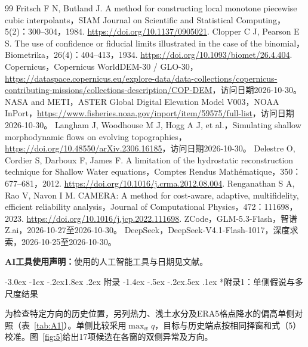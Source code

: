 \documentclass[withoutpreface]{cumcmthesis}
\makeatletter
\providecommand{\heiti}{\CJKfamily{zhhei}}
\renewcommand\section{\@startsection{section}{1}{\z@}%
 {-3.0ex \@plus -1ex \@minus -.2ex}{1.8ex \@plus .2ex}%
 {\centering\normalfont\heiti\fontsize{14}{18}\selectfont\bfseries}}
\renewcommand\subsection{\@startsection{subsection}{2}{\z@}%
 {-1.4ex \@plus -.5ex \@minus -.2ex}{.5ex \@plus .1ex}%
 {\normalfont\heiti\fontsize{14}{18}\selectfont\bfseries}}
\makeatother
\begin{document}
\begin{thebibliography}{99}
 Fritsch F N, Butland J. A method for constructing local monotone piecewise cubic interpolants，SIAM Journal on Scientific and Statistical Computing，5(2)：300–304，1984. \url{https://doi.org/10.1137/0905021}.
 Clopper C J, Pearson E S. The use of confidence or fiducial limits illustrated in the case of the binomial，Biometrika，26(4)：404–413，1934. \url{https://doi.org/10.1093/biomet/26.4.404}.
 Copernicus，Copernicus WorldDEM-30 / GLO-30，\url{https://dataspace.copernicus.eu/explore-data/data-collections/copernicus-contributing-missions/collections-description/COP-DEM}，访问日期2026-10-30。
 NASA and METI，ASTER Global Digital Elevation Model V003，NOAA InPort，\url{https://www.fisheries.noaa.gov/inport/item/59575/full-list}，访问日期2026-10-30。
 Langham J, Woodhouse M J, Hogg A J, et al.，Simulating shallow morphodynamic flows on evolving topographies，\url{https://doi.org/10.48550/arXiv.2306.16185}，访问日期2026-10-30。
 Delestre O, Cordier S, Darboux F, James F. A limitation of the hydrostatic reconstruction technique for Shallow Water equations，Comptes Rendus Mathématique，350：677–681，2012. \url{https://doi.org/10.1016/j.crma.2012.08.004}.
 Renganathan S A, Rao V, Navon I M. CAMERA: A method for cost-aware, adaptive, multifidelity, efficient reliability analysis，Journal of Computational Physics，472：111698，2023. \url{https://doi.org/10.1016/j.jcp.2022.111698}.
 ZCode，GLM-5.3-Flash，智谱 Z.ai，2026-10-27至2026-10-30。
 DeepSeek，DeepSeek-V4.1-Flash-1017，深度求索，2026-10-25至2026-10-30。
\end{thebibliography}

\noindent\textbf{AI工具使用声明：}使用的人工智能工具与日期见文献\cite{ai_zcode,ai_deepseek}。

\FloatBarrier
\clearpage
\section{附录}
\subsection*{附录1：单侧假说与多尺度结果}

为检查特定方向的历史位置，另列热力、浅土水分及ERA5格点降水的偏高单侧对照（表~\ref{tab:A1}）。单侧比较采用$\max_w q$，目标与历史端点按相同择窗和式（5）校准。图~\ref{fig:5}给出17项候选在各窗的双侧异常及方向。
\end{document}
